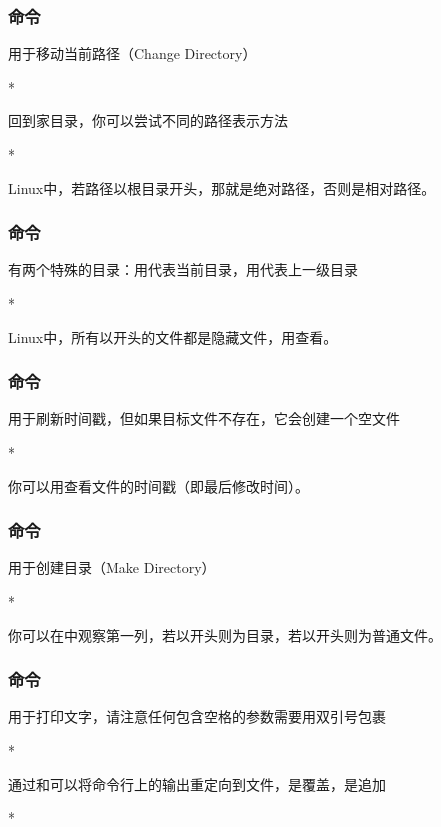 \begin{frame}
    \frametitle{命令}
    用于移动当前路径（Change Directory）
    \begin{Code}*
        
    \end{Code}
    回到家目录，你可以尝试不同的路径表示方法
    \begin{Code}*
        
    \end{Code}
    Linux中，若路径以根目录\code{/}开头，那就是绝对路径，否则是相对路径。
\end{frame}

\begin{frame}
    \frametitle{命令}
    有两个特殊的目录：用代表当前目录，用代表上一级目录
    \begin{Code}*
        
    \end{Code}
    Linux中，所有以开头的文件都是隐藏文件，用查看。
\end{frame}

\begin{frame}
    \frametitle{命令}
    用于刷新时间戳，但如果目标文件不存在，它会创建一个空文件
    \begin{Code}*
        
    \end{Code}
    你可以用查看文件的时间戳（即最后修改时间）。
\end{frame}

\begin{frame}
    \frametitle{命令}
    用于创建目录（Make Directory）
    \begin{Code}*
        
    \end{Code}
    你可以在中观察第一列，若以开头则为目录，若以\code{-}开头则为普通文件。
\end{frame}

\begin{frame}
    \frametitle{命令}
    用于打印文字，请注意任何包含空格的参数需要用双引号包裹
    \begin{Code}*
        
    \end{Code}
    通过\code{>}和\code{>>}可以将命令行上的输出重定向到文件，\code{>}是覆盖，\code{>>}是追加
    \begin{Code}*
        
    \end{Code}
\end{frame}

